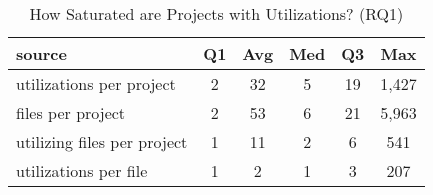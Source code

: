 \begin{table}[tb]
\begin{center}
\caption{How Saturated are Projects with Utilizations? (RQ1)}
\label{table:saturation}

\begin{tabular}{l|ccccc}
\toprule
source & Q1 & Avg & Med & Q3 & Max \\ 
\midrule
utilizations per project & 2 & 32 & 5 & 19 & 1,427 \\ 
\midrule
files per project & 2 & 53 & 6 & 21 & 5,963 \\ 
\midrule
utilizing files per project & 1 & 11 & 2 & 6 & 541 \\ 
\midrule
utilizations per file & 1 & 2 & 1 & 3 & 207 \\ 
\bottomrule
\end{tabular}
\end{center}
\end{table}
